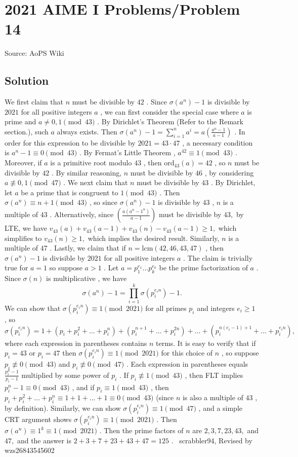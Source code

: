 \documentclass[12pt]{article}
\begin{document}
\section*{{2021 AIME I Problems/Problem 14}}
Source: AoPS Wiki

\subsection*{Solution}
We first claim that $n$ must be divisible by $42$ . Since $\sigma(a^n)-1$ is divisible by $2021$ for all positive integers $a$ , we can first consider the special case where $a$ is prime and $a \neq 0,1 \pmod{43}$ . By Dirichlet's Theorem (Refer to the Remark section.), such $a$ always exists. Then $\sigma(a^n)-1 = \sum_{i=1}^n a^i = a\left(\frac{a^n - 1}{a-1}\right)$ . In order for this expression to be divisible by $2021=43\cdot 47$ , a necessary condition is $a^n - 1 \equiv 0 \pmod{43}$ . By Fermat's Little Theorem , $a^{42} \equiv 1 \pmod{43}$ . Moreover, if $a$ is a primitive root modulo $43$ , then $\text{ord}_{43}(a) = 42$ , so $n$ must be divisible by $42$ . By similar reasoning, $n$ must be divisible by $46$ , by considering $a \not\equiv 0,1 \pmod{47}$ . We next claim that $n$ must be divisible by $43$ . By Dirichlet, let $a$ be a prime that is congruent to $1 \pmod{43}$ . Then $\sigma(a^n) \equiv n+1 \pmod{43}$ , so since $\sigma(a^n)-1$ is divisible by $43$ , $n$ is a multiple of $43$ . Alternatively, since $\left(\frac{a(a^n - 1^n)}{a-1}\right)$ must be divisible by $43,$ by LTE, we have $v_{43}(a)+v_{43}{(a-1)}+v_{43}{(n)}-v_{43}{(a-1)} \geq 1,$ which simplifies to $v_{43}(n) \geq 1,$ which implies the desired result. Similarly, $n$ is a multiple of $47$ . Lastly, we claim that if $n = \text{lcm}(42, 46, 43, 47)$ , then $\sigma(a^n) - 1$ is divisible by $2021$ for all positive integers $a$ . The claim is trivially true for $a=1$ so suppose $a>1$ . Let $a = p_1^{e_1}\ldots p_k^{e_k}$ be the prime factorization of $a$ . Since $\sigma(n)$ is multiplicative , we have \[\sigma(a^n) - 1 = \prod_{i=1}^k \sigma(p_i^{e_in}) - 1.\] We can show that $\sigma(p_i^{e_in}) \equiv 1 \pmod{2021}$ for all primes $p_i$ and integers $e_i \ge 1$ , so \[\sigma(p_i^{e_in}) = 1 + (p_i + p_i^2 + \ldots + p_i^n) + (p_i^{n+1} + \ldots + p_i^{2n}) + \ldots + (p_i^{n(e_i-1)+1} + \ldots + p_i^{e_in}),\] where each expression in parentheses contains $n$ terms. It is easy to verify that if $p_i = 43$ or $p_i = 47$ then $\sigma(p_i^{e_in}) \equiv 1 \pmod{2021}$ for this choice of $n$ , so suppose $p_i \not\equiv 0 \pmod{43}$ and $p_i \not\equiv 0 \pmod{47}$ . Each expression in parentheses equals $\frac{p_i^n - 1}{p_i - 1}$ multiplied by some power of $p_i$ . If $p_i \not\equiv 1 \pmod{43}$ , then FLT implies $p_i^n - 1 \equiv 0 \pmod{43}$ , and if $p_i \equiv 1 \pmod{43}$ , then $p_i + p_i^2 + \ldots + p_i^n \equiv 1 + 1 + \ldots + 1 \equiv 0 \pmod{43}$ (since $n$ is also a multiple of $43$ , by definition). Similarly, we can show $\sigma(p_i^{e_in}) \equiv 1 \pmod{47}$ , and a simple CRT argument shows $\sigma(p_i^{e_in}) \equiv 1 \pmod{2021}$ . Then $\sigma(a^n) \equiv 1^k \equiv 1 \pmod{2021}$ . Then the prime factors of $n$ are $2,3,7,23,43,$ and $47,$ and the answer is $2+3+7+23+43+47 = \boxed{125}$ . ~scrabbler94, Revised by wzs26843545602
\end{document}
